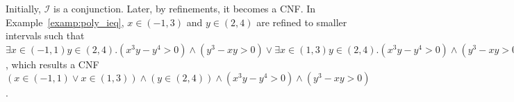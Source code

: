 \documentclass[runningheads,a4paper,oribibl]{llncs}
\newcommand{\Real}{{\mathbb R}}
\newcommand{\Rat}{{\mathbb Q}}
\newcommand{\suppress}[1]{} %
\newcommand{\mizuhito}[1]{\{{\bf Mizuhito:~\sf #1}\}} %
\begin{document}
\suppress{
\begin{lemma} \label{cor:rattoreal}
For a polynomial inequality
$F = \exists x_1 \in I_1 \cdots x_n \in I_n. \bigwedge \limits_{j=1}^m f_j > 0$, 
If there exists an SAT instance of F in $\Real^n$, there exists also in $\Rat^n$. 
\end{lemma}

\begin{lemma} \label{cor:refinement}
Suppose that $a_j < b_j$ for $1 \leq j \leq n$ and $f_i$'s are polynomials. 
Assume $a_k < c < b_k$ for some $k$. 
Then, 
$\exists x_1 \in (a_1,b_1) \cdots x_n \in (a_n,b_n). \bigwedge \limits_{i=1}^m f_i > 0$ 
is SAT (resp. UNSAT) if, and only if, 
$\exists x_1 \in (a_1,b_1) \cdots x_k \in (a_k,c) \cdots x_n \in (a_n,b_n). 
 \bigwedge \limits_{i=1}^m f_i > 0 
 \vee 
 \exists x_1 \in (a_1,b_1) \cdots x_k \in (c,b_k) \cdots x_n \in (a_n,b_n)). 
 \bigwedge \limits_{i=1}^m f_i > 0$ 
is SAT (resp. UNSAT). 
\end{lemma}

\begin{pf}
We show for the SAT case. If-part is obvious. For only-if-part, 
since $\mathbb{S}(\bigwedge \limits_{i=1}^m f_i > 0)$ is an open set, 
if $y \in (a_1,b_1) \times \cdots \{c\} \cdots \times (a_n,b_n)$ satisfies 
$\bigwedge \limits_{i=1}^m f_i > 0$, 
there exists $x_1 \in (a_1,b_1) \cdots x_k \in (a_k,c) \cdots x_n \in (a_n,b_n)$
(also $x_1 \in (a_1,b_1) \cdots x_k \in (c,b_k) \cdots x_n \in (a_n,b_n)$) that satisfies
$\bigwedge \limits_{i=1}^m f_i > 0$. 
\end{pf}

Lemma~\ref{cor:rattoreal} says that proving SAT of $F$ in $\Real$ is reduced to 
that in $\Rat$. 
Lemma~\ref{cor:refinement} says that, in the refinement step, we can apply refinement 
$x_k \in (a_k,b_k)$ to $x_k \in (a_k,c) \vee x_k \in (c,b_k)$, 
instead of $x_k \in (a_k,c] \vee x_k \in (c,b_k) $
(i.e., $c$ is ignored). 
}

Initially, ${\mathcal I}$ is a conjunction. Later, by refinements, it becomes a CNF. 
In Example~\ref{examp:poly_ieq}, 
$x \in (-1,3)$ and $y \in (2,4)$ are refined to smaller intervals
such that 
$\exists x \in (-1,1) y \in (2,4) . (x^3y - y^4 > 0) \wedge (y^3 -xy >0) \vee 
 \exists x \in (1,3) y \in (2,4) . (x^3y - y^4 > 0) \wedge (y^3 -xy >0)$, 
which results a CNF 
$(x \in (-1,1) \vee x \in (1,3)) \wedge (y \in (2,4)) \wedge (x^3y - y^4 > 0) \wedge (y^3 -xy >0)$.
\end{document}
